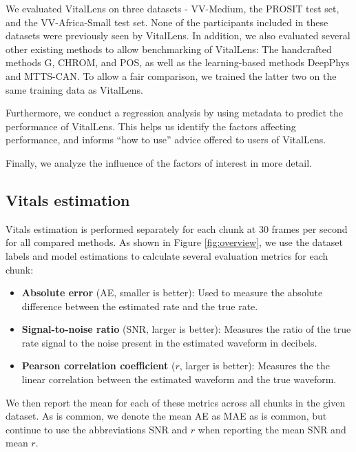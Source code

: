 \documentclass{article}
\begin{document}
We evaluated VitalLens on three datasets - VV-Medium, the PROSIT test set, and the VV-Africa-Small test set.
None of the participants included in these datasets were previously seen by VitalLens.
In addition, we also evaluated several other existing methods to allow benchmarking of VitalLens:
The handcrafted methods G, CHROM, and POS, as well as the learning-based methods DeepPhys and MTTS-CAN.
To allow a fair comparison, we trained the latter two on the same training data as VitalLens.

Furthermore, we conduct a regression analysis by using metadata to predict the performance of VitalLens.
This helps us identify the factors affecting performance, and informs ``how to use'' advice offered to users of VitalLens.

Finally, we analyze the influence of the factors of interest in more detail.

\subsection{Vitals estimation}

Vitals estimation is performed separately for each chunk at 30 frames per second for all compared methods.
As shown in Figure \ref{fig:overview}, we use the dataset labels and model estimations to calculate several evaluation metrics for each chunk:

\begin{itemize}
	\item \textbf{Absolute error} (AE, smaller is better): Used to measure the absolute difference between the estimated rate and the true rate.
	\item \textbf{Signal-to-noise ratio} (SNR, larger is better): Measures the ratio of the true rate signal to the noise present in the estimated waveform in decibels.
	\item \textbf{Pearson correlation coefficient} ($r$, larger is better): Measures the the linear correlation between the estimated waveform and the true waveform.
\end{itemize}

We then report the mean for each of these metrics across all chunks in the given dataset.
As is common, we denote the mean AE as MAE as is common, but continue to use the abbreviations SNR and $r$ when reporting the mean SNR and mean $r$.

\newcommand{\printMetric}[1]{%
  \ifthenelse{\equal{#1}{0.0}}%
    {--}%
    {\sisetup{round-mode=places,round-precision=2}\num{#1}}%
}
\end{document}
